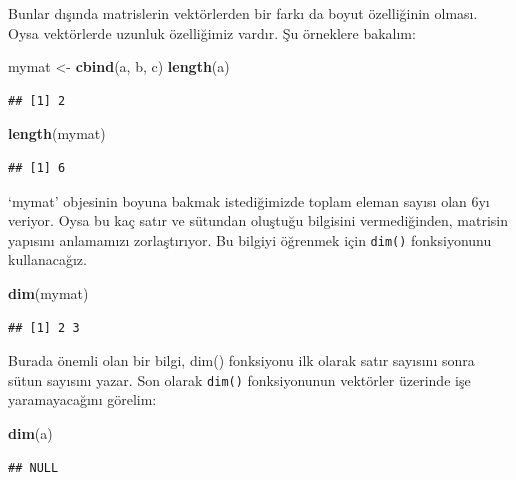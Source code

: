 \documentclass[
]{book}
\newenvironment{Shaded}{\begin{snugshade}}{\end{snugshade}}
\newcommand{\KeywordTok}[1]{\textcolor[rgb]{0.13,0.29,0.53}{\textbf{#1}}}
\newcommand{\NormalTok}[1]{#1}
\newcommand{\StringTok}[1]{\textcolor[rgb]{0.31,0.60,0.02}{#1}}
\begin{document}
Bunlar dışında matrislerin vektörlerden bir farkı da boyut özelliğinin olması. Oysa vektörlerde uzunluk özelliğimiz vardır. Şu örneklere bakalım:

\begin{Shaded}
\begin{Highlighting}[]
\NormalTok{mymat <{-}}\StringTok{ }\KeywordTok{cbind}\NormalTok{(a, b, c)}
\KeywordTok{length}\NormalTok{(a)}
\end{Highlighting}
\end{Shaded}

\begin{verbatim}
## [1] 2
\end{verbatim}

\begin{Shaded}
\begin{Highlighting}[]
\KeywordTok{length}\NormalTok{(mymat)}
\end{Highlighting}
\end{Shaded}

\begin{verbatim}
## [1] 6
\end{verbatim}

`mymat' objesinin boyuna bakmak istediğimizde toplam eleman sayısı olan 6yı veriyor. Oysa bu kaç satır ve sütundan oluştuğu bilgisini vermediğinden, matrisin yapısını anlamamızı zorlaştırıyor. Bu bilgiyi öğrenmek için \texttt{dim()} fonksiyonunu kullanacağız.

\begin{Shaded}
\begin{Highlighting}[]
\KeywordTok{dim}\NormalTok{(mymat)}
\end{Highlighting}
\end{Shaded}

\begin{verbatim}
## [1] 2 3
\end{verbatim}

Burada önemli olan bir bilgi, dim() fonksiyonu ilk olarak satır sayısını sonra sütun sayısını yazar. Son olarak \texttt{dim()} fonksiyonunun vektörler üzerinde işe yaramayacağını görelim:

\begin{Shaded}
\begin{Highlighting}[]
\KeywordTok{dim}\NormalTok{(a)}
\end{Highlighting}
\end{Shaded}

\begin{verbatim}
## NULL
\end{verbatim}
\end{document}
